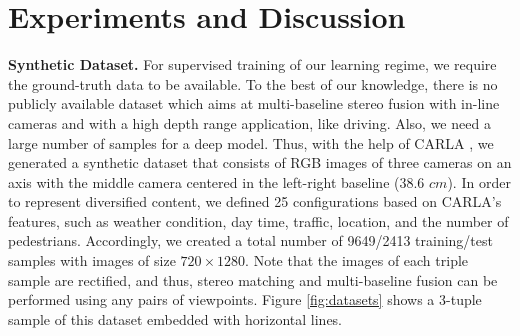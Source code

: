 \documentclass[10pt,twocolumn,letterpaper]{article}
\begin{document}
\section{Experiments and Discussion}
\label{ExperimentalResults}
\noindent\textbf{Synthetic Dataset.} For supervised training of our learning regime, we require the ground-truth data to be available. To the best of our knowledge, there is no publicly available dataset which aims at multi-baseline stereo fusion with in-line cameras and with a high depth range application, like driving. Also, we need a large number of samples for a deep model. Thus, with the help of CARLA \cite{dosovitskiy2017carla}, we generated a synthetic dataset that consists of RGB images of three cameras on an axis with the middle camera centered in the left-right baseline (38.6 $cm$). In order to represent diversified content, we defined 25 configurations based on CARLA's features, such as weather condition, day time, traffic, location, and the number of pedestrians. Accordingly, we created a total number of 9649/2413 training/test samples with images of size $720\times1280$. Note that the images of each triple sample are rectified, and thus, stereo matching and multi-baseline fusion can be performed using any pairs of viewpoints. Figure \ref{fig:datasets} shows a 3-tuple sample of this dataset embedded with horizontal lines.
\end{document}
